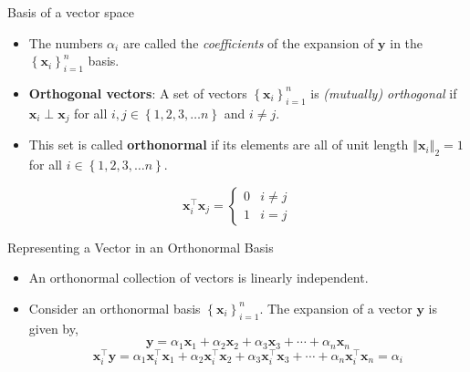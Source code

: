 \documentclass[aspectratio=169]{beamer}
\begin{document}
\begin{frame}[t]{Basis of a vector space}
  \begin{itemize}
    \item The numbers $\alpha_i$ are called the \textit{coefficients} of the expansion of $\mathbf{y}$ in the $\left\{\mathbf{x}_i\right\}_{i=1}^n$ basis.
    
    \item \textbf{Orthogonal vectors}: A set of vectors $\left\{\mathbf{x}_i\right\}_{i=1}^n$ is \textit{(mutually) orthogonal} if $\mathbf{x}_i \perp \mathbf{x}_j$ for all $i, j \in \left\{1, 2, 3, \ldots n\right\}$ and $i \neq j$.
    
    \item This set is called \textbf{orthonormal} if its elements are all of unit length $\left\Vert \mathbf{x}_i \right\Vert_2 = 1$ for all $i \in \left\{1, 2, 3, \ldots n\right\}$.
  \end{itemize}
  \[ \mathbf{x}_i^\top\mathbf{x}_j = \begin{cases} 
    0 & i \neq j \\
    1 & i = j 
  \end{cases}
  \]
\end{frame}


\begin{frame}[t]{Representing a Vector in an Orthonormal Basis}
  \begin{itemize}
    \item An orthonormal collection of vectors is linearly independent.
    \item Consider an orthonormal basis $\left\{\mathbf{x}_i\right\}_{i=1}^{n}$. The expansion of a vector $\mathbf{y}$ is given by,
    \[ \mathbf{y} = \alpha_1\mathbf{x}_1 + \alpha_2\mathbf{x}_2 + \alpha_3\mathbf{x}_3 + \cdots + \alpha_n\mathbf{x}_n \]
    \[ \mathbf{x}_i^\top\mathbf{y} = \alpha_1\mathbf{x}_i^\top\mathbf{x}_1 + \alpha_2\mathbf{x}_i^\top\mathbf{x}_2 + \alpha_3\mathbf{x}_i^\top\mathbf{x}_3 + \cdots + \alpha_n\mathbf{x}_i^\top\mathbf{x}_n = \alpha_i\]
  \end{itemize}
\end{frame}
\end{document}

